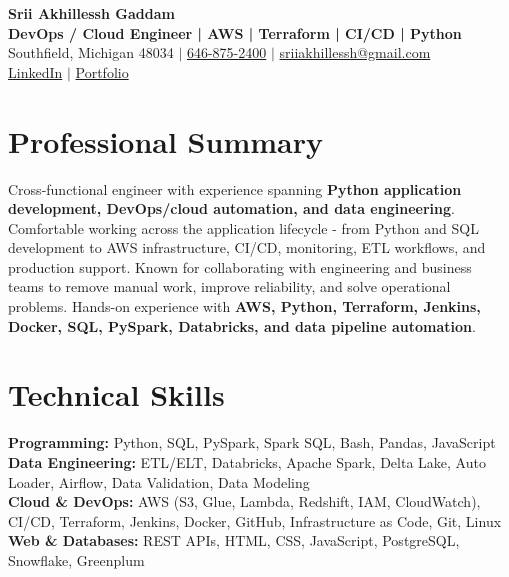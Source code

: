 \documentclass[letterpaper,10pt]{article}
\begin{document}
\fontsize{9.35pt}{10.45pt}\selectfont

\begin{center}
    {\LARGE \textbf{Srii Akhillessh Gaddam}} \\[-1pt]
    \textbf{DevOps / Cloud Engineer | AWS | Terraform | CI/CD | Python} \\[2pt]
    Southfield, Michigan 48034 $|$
    \href{tel:6468752400}{646-875-2400} $|$
    \href{mailto:sriiakhillessh@gmail.com}{sriiakhillessh@gmail.com} \\[1pt]
    \href{https://www.linkedin.com/in/srii-akhiilessh-gaddam-b48668191/}{LinkedIn} $|$
    \href{https://sriiakhillesshg.github.io/portfolio/}{Portfolio}
\end{center}
\vspace{-8pt}

\section{Professional Summary}
\small{Cross-functional engineer with experience spanning \textbf{Python application development, DevOps/cloud automation, and data engineering}. Comfortable working across the application lifecycle - from Python and SQL development to AWS infrastructure, CI/CD, monitoring, ETL workflows, and production support. Known for collaborating with engineering and business teams to remove manual work, improve reliability, and solve operational problems. Hands-on experience with \textbf{AWS, Python, Terraform, Jenkins, Docker, SQL, PySpark, Databricks, and data pipeline automation}.}

\section{Technical Skills}
\small{
\textbf{Programming:} Python, SQL, PySpark, Spark SQL, Bash, Pandas, JavaScript \\
\textbf{Data Engineering:} ETL/ELT, Databricks, Apache Spark, Delta Lake, Auto Loader, Airflow, Data Validation, Data Modeling \\
\textbf{Cloud \& DevOps:} AWS (S3, Glue, Lambda, Redshift, IAM, CloudWatch), CI/CD, Terraform, Jenkins, Docker, GitHub, Infrastructure as Code, Git, Linux \\
\textbf{Web \& Databases:} REST APIs, HTML, CSS, JavaScript, PostgreSQL, Snowflake, Greenplum
}
\end{document}
